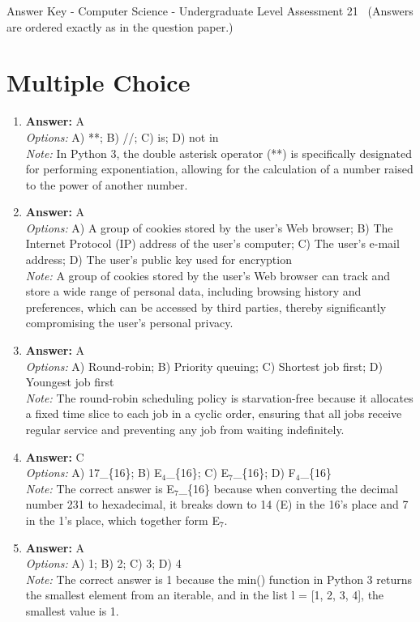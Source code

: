 \documentclass[12pt]{article}
\begin{document}
\begin{center}
Answer Key - Computer Science - Undergraduate Level Assessment 21 \
\small (Answers are ordered exactly as in the question paper.)
\end{center}

\section*{Multiple Choice}
\begin{enumerate}[label=\arabic*.]
\item \textbf{Answer:} A
\\ \textit{Options:} A) **; B) //; C) is; D) not in
\\ \textit{Note:} In Python 3, the double asterisk operator (**) is specifically designated for performing exponentiation, allowing for the calculation of a number raised to the power of another number.
\item \textbf{Answer:} A
\\ \textit{Options:} A) A group of cookies stored by the user's Web browser; B) The Internet Protocol (IP) address of the user's computer; C) The user's e-mail address; D) The user's public key used for encryption
\\ \textit{Note:} A group of cookies stored by the user's Web browser can track and store a wide range of personal data, including browsing history and preferences, which can be accessed by third parties, thereby significantly compromising the user's personal privacy.
\item \textbf{Answer:} A
\\ \textit{Options:} A) Round-robin; B) Priority queuing; C) Shortest job first; D) Youngest job first
\\ \textit{Note:} The round-robin scheduling policy is starvation-free because it allocates a fixed time slice to each job in a cyclic order, ensuring that all jobs receive regular service and preventing any job from waiting indefinitely.
\item \textbf{Answer:} C
\\ \textit{Options:} A) 17\_\{16\}; B) E$_{4}$\_\{16\}; C) E$_{7}$\_\{16\}; D) F$_{4}$\_\{16\}
\\ \textit{Note:} The correct answer is E$_{7}$\_\{16\} because when converting the decimal number 231 to hexadecimal, it breaks down to 14 (E) in the 16's place and 7 in the 1's place, which together form E$_{7}$.
\item \textbf{Answer:} A
\\ \textit{Options:} A) 1; B) 2; C) 3; D) 4
\\ \textit{Note:} The correct answer is 1 because the min() function in Python 3 returns the smallest element from an iterable, and in the list l = [1, 2, 3, 4], the smallest value is 1.
\end{enumerate}
\end{document}

